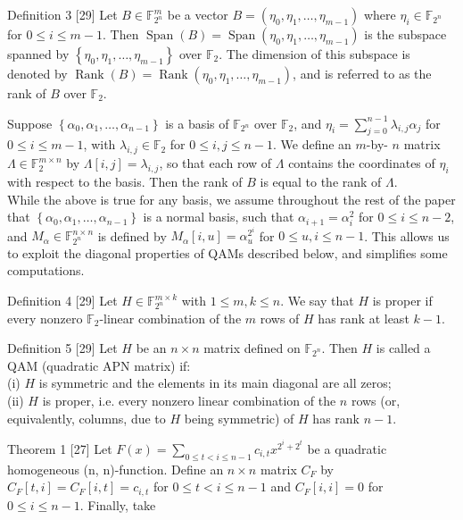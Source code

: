 \documentclass[10pt]{article}
\begin{document}
Definition 3 [29] Let $B \in \mathbb{F}_{2^{n}}^{m}$ be a vector $B=\left(\eta_{0}, \eta_{1}, \ldots, \eta_{m-1}\right)$ where $\eta_{i} \in \mathbb{F}_{2^{n}}$ for $0 \leq i \leq m-1$. Then $\operatorname{Span}(B)=\operatorname{Span}\left(\eta_{0}, \eta_{1}, \ldots, \eta_{m-1}\right)$ is the subspace spanned by $\left\{\eta_{0}, \eta_{1}, \ldots, \eta_{m-1}\right\}$ over $\mathbb{F}_{2}$. The dimension of this subspace is denoted by $\operatorname{Rank}(B)=\operatorname{Rank}\left(\eta_{0}, \eta_{1}, \ldots, \eta_{m-1}\right)$, and is referred to as the rank of $B$ over $\mathbb{F}_{2}$.

Suppose $\left\{\alpha_{0}, \alpha_{1}, \ldots, \alpha_{n-1}\right\}$ is a basis of $\mathbb{F}_{2^{n}}$ over $\mathbb{F}_{2}$, and $\eta_{i}=\sum_{j=0}^{n-1} \lambda_{i, j} \alpha_{j}$ for $0 \leq i \leq m-1$, with $\lambda_{i, j} \in \mathbb{F}_{2}$ for $0 \leq i, j \leq n-1$. We define an $m$-by- $n$ matrix $\Lambda \in \mathbb{F}_{2}^{m \times n}$ by $\Lambda[i, j]=\lambda_{i, j}$, so that each row of $\Lambda$ contains the coordinates of $\eta_{i}$ with respect to the basis. Then the rank of $B$ is equal to the rank of $\Lambda$.\\
While the above is true for any basis, we assume throughout the rest of the paper that $\left\{\alpha_{0}, \alpha_{1}, \ldots, \alpha_{n-1}\right\}$ is a normal basis, such that $\alpha_{i+1}=\alpha_{i}^{2}$ for $0 \leq i \leq n-2$, and $M_{\alpha} \in \mathbb{F}_{2^{n}}^{n \times n}$ is defined by $M_{\alpha}[i, u]=\alpha_{u}^{2^{i}}$ for $0 \leq u, i \leq n-1$. This allows us to exploit the diagonal properties of QAMs described below, and simplifies some computations.

Definition 4 [29] Let $H \in \mathbb{F}_{2^{n}}^{m \times k}$ with $1 \leq m, k \leq n$. We say that $H$ is proper if every nonzero $\mathbb{F}_{2}$-linear combination of the $m$ rows of $H$ has rank at least $k-1$.

Definition 5 [29] Let $H$ be an $n \times n$ matrix defined on $\mathbb{F}_{2^{n}}$. Then $H$ is called a QAM (quadratic APN matrix) if:\\
(i) $H$ is symmetric and the elements in its main diagonal are all zeros;\\
(ii) $H$ is proper, i.e. every nonzero linear combination of the $n$ rows (or, equivalently, columns, due to $H$ being symmetric) of $H$ has rank $n-1$.

Theorem 1 [27] Let $F(x)=\sum_{0 \leq t<i \leq n-1} c_{i, t} x^{2^{i}+2^{t}}$ be a quadratic homogeneous (n, n)-function. Define an $n \times n$ matrix $C_{F}$ by $C_{F}[t, i]=C_{F}[i, t]=c_{i, t}$ for $0 \leq t<i \leq n-1$ and $C_{F}[i, i]=0$ for $0 \leq i \leq n-1$. Finally, take
\end{document}
